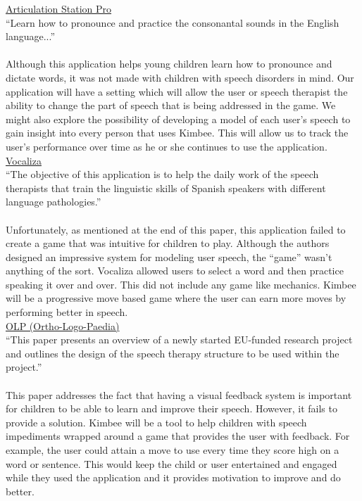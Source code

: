 \documentclass{article}
\begin{document}
\href{https://itunes.apple.com/us/app/articulation-station-pro/id491998279}{Articulation Station Pro}\\
``Learn how to pronounce and practice the consonantal sounds in the English language...''\\\\
Although this application helps young children learn how to pronounce and dictate words, it was not made with children with speech disorders in mind. Our application will have a setting which will allow the user or speech therapist the ability to change the part of speech that is being addressed in the game. We might also explore the possibility of developing a model of each user's speech to gain insight into every person that uses Kimbee. This will allow us to track the user’s performance over time as he or she continues to use the application.\\[25 pt]
\href{http://dihana.cps.unizar.es/~alborada/docu/2006cvaquero.pdf}{Vocaliza}\\
``The objective of this application is to help the daily work of the speech therapists that train the linguistic skills of Spanish speakers with different language pathologies.''\\\\
Unfortunately, as mentioned at the end of this paper, this application failed to create a game that was intuitive for children to play. Although the authors designed an impressive system for modeling user speech, the “game” wasn’t anything of the sort. Vocaliza allowed users to select a word and then practice speaking it over and over. This did not include any game like mechanics. Kimbee will be a progressive move based game where the user can earn more moves by performing better in speech.\\[25 pt]
\href{http://www.speech.kth.se/prod/publications/files/841.pdf}{OLP (Ortho-Logo-Paedia)}\\
``This paper presents an overview of a newly started EU-funded research project and outlines the design of the speech therapy structure to be used within the project.''\\\\
This paper addresses the fact that having a visual feedback system is important for children to be able to learn and improve their speech. However, it fails to provide a solution. Kimbee will be a tool to help children with speech impediments wrapped around a game that provides the user with feedback. For example, the user could attain a move to use every time they score high on a word or sentence. This would keep the child or user entertained and engaged while they used the application and it provides motivation to improve and do better.
\end{document}
